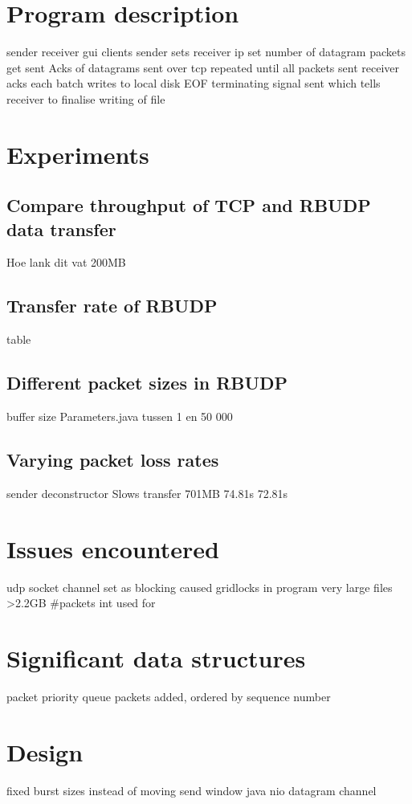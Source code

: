 \documentclass[a4paper,10pt]{article}
\begin{document}
\section{Program description}
sender receiver gui clients
sender sets receiver ip
set number of datagram packets get sent
Acks of datagrams sent over tcp
repeated until all packets sent
receiver acks each batch 
writes to local disk
EOF terminating signal sent which tells receiver to finalise writing of file

\section{Experiments}
\subsection{Compare throughput of TCP and RBUDP data transfer}
Hoe lank dit vat 200MB

\subsection{Transfer rate of RBUDP}
table

\subsection{Different packet sizes in RBUDP}
buffer size Parameters.java tussen 1 en 50 000

\subsection{Varying packet loss rates}
sender deconstructor
Slows transfer 
701MB
74.81s
72.81s

\section{Issues encountered}
udp socket channel set as blocking caused gridlocks in program
very large files >2.2GB \#packets int used for %

\section{Significant data structures}
packet
priority queue packets added, ordered by sequence number

\section{Design}
fixed burst sizes instead of moving send window
java nio datagram channel
\end{document}
